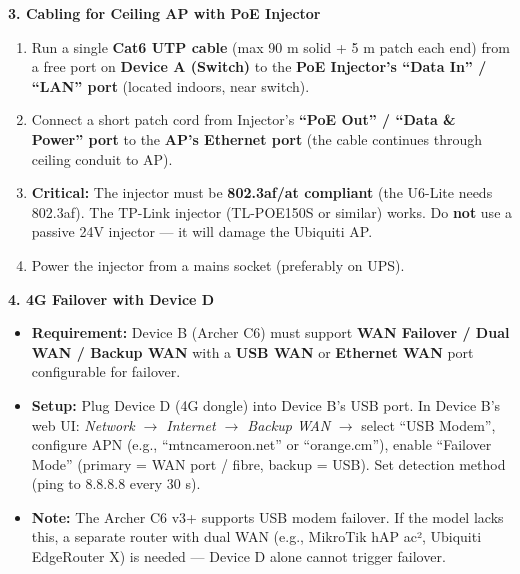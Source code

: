 \documentclass[11pt]{article}
\begin{document}
\begin{exoresolu}
\textbf{3. Cabling for Ceiling AP with PoE Injector}
\begin{enumerate}
\item Run a single \textbf{Cat6 UTP cable} (max 90 m solid + 5 m patch each end) from a free port on \textbf{Device A (Switch)} to the \textbf{PoE Injector's ``Data In'' / ``LAN'' port} (located indoors, near switch).
\item Connect a short patch cord from Injector's \textbf{``PoE Out'' / ``Data \& Power'' port} to the \textbf{AP's Ethernet port} (the cable continues through ceiling conduit to AP).
\item \textbf{Critical:} The injector must be \textbf{802.3af/at compliant} (the U6-Lite needs 802.3af). The TP-Link injector (TL-POE150S or similar) works. Do \textbf{not} use a passive 24V injector — it will damage the Ubiquiti AP.
\item Power the injector from a mains socket (preferably on UPS).
\end{enumerate}

\textbf{4. 4G Failover with Device D}
\begin{itemize}
\item \textbf{Requirement:} Device B (Archer C6) must support \textbf{WAN Failover / Dual WAN / Backup WAN} with a \textbf{USB WAN} or \textbf{Ethernet WAN} port configurable for failover.
\item \textbf{Setup:} Plug Device D (4G dongle) into Device B's USB port. In Device B's web UI: \textit{Network $\rightarrow$ Internet $\rightarrow$ Backup WAN} $\rightarrow$ select ``USB Modem'', configure APN (e.g., ``mtncameroon.net'' or ``orange.cm''), enable ``Failover Mode'' (primary = WAN port / fibre, backup = USB). Set detection method (ping to 8.8.8.8 every 30 s).
\item \textbf{Note:} The Archer C6 v3+ supports USB modem failover. If the model lacks this, a separate router with dual WAN (e.g., MikroTik hAP ac², Ubiquiti EdgeRouter X) is needed — Device D alone cannot trigger failover.
\end{itemize}
\end{exoresolu}
\end{document}
